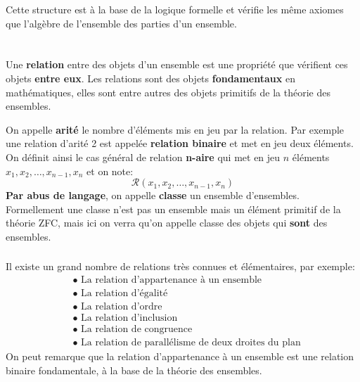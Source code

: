 
Cette structure est à la base de la logique formelle et vérifie les même axiomes que l'algèbre de l'ensemble des parties d'un ensemble.

\chapter*{}

Une \textbf{relation} entre des objets d'un ensemble est une propriété que vérifient ces objets \textbf{entre eux}.\+
Les relations sont des objets \textbf{fondamentaux} en mathématiques, elles sont entre autres des objets primitifs de la théorie des ensembles.\<

On appelle \textbf{arité} le nombre d'éléments mis en jeu par la relation.\+ Par exemple une relation d'arité 2 est appelée \textbf{relation binaire} et met en jeu deux éléments. On définit ainsi le cas général de relation \textbf{n-aire} qui met en jeu \(n\) éléments \(x_1, x_2, \ldots, x_{n-1}, x_n\) et on note:
\[
    \mathscr{R}(x_1, x_2, \ldots, x_{n-1}, x_n)
\]
\textbf{Par abus de langage}, on appelle \textbf{classe} un ensemble d'ensembles.\+
Formellement une classe n'est pas un ensemble mais un élément primitif de la théorie ZFC, mais ici on verra qu'on appelle classe des objets qui \textbf{sont} des ensembles.

\subsection*{}

Il existe un grand nombre de relations très connues et élémentaires, par exemple:
\begin{align*}
    &\bullet \text{ La relation d'appartenance à un ensemble} \\
    &\bullet \text{ La relation d'égalité} \\
    &\bullet \text{ La relation d'ordre} \\
    &\bullet \text{ La relation d'inclusion} \\
    &\bullet \text{ La relation de congruence} \\
    &\bullet \text{ La relation de parallélisme de deux droites du plan}
\end{align*}
On peut remarque que la relation d'appartenance à un ensemble est une relation binaire fondamentale, à la base de la théorie des ensembles.


